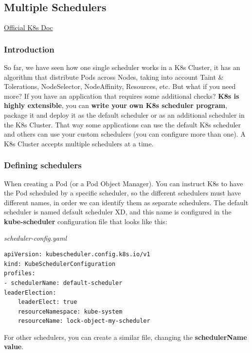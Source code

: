 \documentclass{article}
\newenvironment{codetemplate}[1][]{%
  \mybasecolorbox[#1]
  \itshape
}{%
  \endmybasecolorbox
}
\begin{document}
\subsection{Multiple Schedulers}

\href{https://kubernetes.io/docs/tasks/extend-kubernetes/configure-multiple-schedulers/}{Official K8s Doc}

\subsubsection{Introduction}

So far, we have seen how one single scheduler works in a K8s Cluster, it has an algorithm that distribute Pods across Nodes, taking into account Taint \& Tolerations, NodeSelector, NodeAffinity, Resources, etc. But what if you need more? If you have an application that requires some additional checks? \textbf{K8s is highly extensible}, you can\textbf{ write your own K8s scheduler program}, package it and deploy it as the default scheduler or as an additional scheduler in the K8s Cluster. That way some applications can use the default K8s scheduler and others can use your custom schedulers (you can configure more than one). A K8s Cluster accepts multiple schedulers at a time.

\subsubsection{Defining schedulers}

When creating a Pod (or a Pod Object Manager). You can instruct K8s to have the Pod scheduled by a specific scheduler, so the different schedulers must have different names, in order we can identify them as separate schedulers. The default scheduler is named default scheduler XD, and this name is configured in the \textbf{kube-scheduler} configuration file that looks like this:

\begin{codetemplate}{scheduler-config.yaml}
\begin{verbatim}
apiVersion: kubescheduler.config.k8s.io/v1
kind: KubeSchedulerConfiguration
profiles:
- schedulerName: default-scheduler
leaderElection:
    leaderElect: true
    resourceNamespace: kube-system
    resourceName: lock-object-my-scheduler
\end{verbatim}
\end{codetemplate}

For other schedulers, you can create a similar file, changing the \textbf{schedulerName value}.
\end{document}

